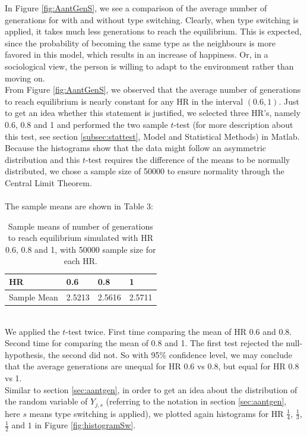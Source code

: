 In Figure \ref{fig:AantGenS}, we see a comparison of the average number of generations for with and without type switching. 
Clearly, when type switching is applied, it takes much less generations to reach the equilibrium. 
This is expected, since the probability of becoming the same type as the neighbours is more favored in this model, which results in an increase of happiness. 
Or, in a sociological view, the person is willing to adapt to the environment rather than moving on.\\

From Figure \ref{fig:AantGenS}, we observed that the average number of generations to reach equilibrium is nearly constant for any HR in the interval \((0.6,1)\). 
Just to get an idea whether this statement is justified, we selected three HR's, namely 0.6, 0.8 and 1 and performed the two sample \(t\)-test (for more description about this test, see section \ref{subsec:stattest}, Model and Statistical Methods) in Matlab. Because the histograms show that the data might follow an asymmetric distribution and this \(t\)-test requires the difference of the means to be normally distributed, we chose a sample size of 50000 to ensure normality through the Central Limit Theorem.\\
\\
The sample means are shown in Table 3:
\begin{table}[htp]
\centering
\caption{Sample means of number of generations to reach equilibrium simulated with HR 0.6, 0.8 and 1, with 50000 sample size for each HR.}
\begin{tabular}{|l|l|l|l|}
\hline
 HR&0.6&0.8&1 \\ \hline
 Sample Mean&2.5213&2.5616&2.5711  \\ \hline 
\end{tabular}
\end{table}
\\
We applied the \(t\)-test twice. First time comparing the mean of HR 0.6 and 0.8. Second time for comparing the mean of 0.8 and 1. The first test rejected the null-hypothesis, the second did not. So with 95\% confidence level, we may conclude that the average generations are unequal for HR 0.6 vs 0.8, but equal for HR 0.8 vs 1.\\
\newpage
Similar to section \ref{sec:aantgen}, in order to get an idea about the distribution of the random variable of $Y_{j,s}$ (referring to the notation in section \ref{sec:aantgen}, here \(s\) means type switching is applied), we plotted again histograms for HR $\frac{1}{4}$, $\frac{1}{3}$, $\frac{1}{2}$ and $1$ in Figure \ref{fig:histogramSw}.

